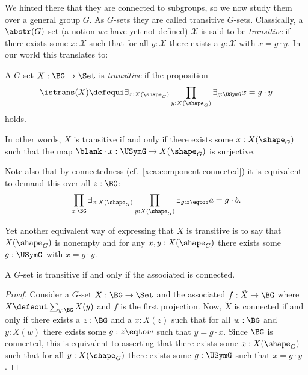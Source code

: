 We hinted there that they are connected to subgroups, so
we now study them over a general group $G$.
As $G$-sets they are called transitive $G$-sets.
Classically, a $\abstr(G)$-set (a notion \emph{we} have yet not defined) $\mathcal X$ is said to be \emph{transitive} if there exists some $x:\mathcal X$ such that for all $y:\mathcal X$ there exists a $g:\mathcal X$ with $x=g\cdot y$.  In our world this translates to:
\begin{definition}\label{def:transitiveGset}
  A $G$-set $X:\BG\to\Set$ is \emph{transitive} if the proposition
  \[
    \istrans(X) \defequi
    \exists_{x:X(\shape_G)} \prod_{y:X(\shape_G)} \exists_{g:\USymG} x=g\cdot y
  \]
  holds.
\end{definition}
\begin{remark}
  In other words, $X$ is transitive if and only if there exists
  some $x:X(\shape_G)$ such that the map $\blank\cdot x:\USymG\to X(\shape_G)$ is
  surjective.

  Note also that by connectedness (cf.~\cref{xca:component-connected})
  it is equivalent to demand this over all $z:\BG$:
  \begin{equation}\label{eq:Gset-trans-gen}
    \prod_{z:\BG}\exists_{x:X(\shape_G)}
    \prod_{y:X(\shape_G)}\exists_{g:z\eqto z}a=g\cdot b.
  \end{equation}

  Yet another equivalent way of expressing that $X$ is transitive is to say
  that $X(\shape_G)$ is nonempty and for any $x,y:X(\shape_G)$ there
  exists some $g:\USymG$ with $x = g\cdot y$.
\end{remark}

\begin{lemma}
  \label{lem:conistrans}
  A $G$-set is transitive if and only if the associated \covering is connected.
\end{lemma}
\begin{proof}
  Consider a $G$-set $X:\BG\to\Set$ and the associated \covering
  $f:\tilde X\to\BG$ where $\tilde X\defequi\sum_{y:\BG}X(y)$ and $f$
  is the first projection.  Now, $\tilde X$ is connected if and only
  if there exists a $z:\BG$ and a $x:X(z)$ such that for
  all $w:\BG$ and $y:X(w)$ there exists some $g:z\eqto w$ such that $y=g\cdot x$.
  Since $\BG$ is connected, this is equivalent to asserting that there
  exists some $x:X(\shape_G)$ such that for all $y:X(\shape_G)$ there exists
  some $g:\USymG$ such that $x=g\cdot y$.
\end{proof}

